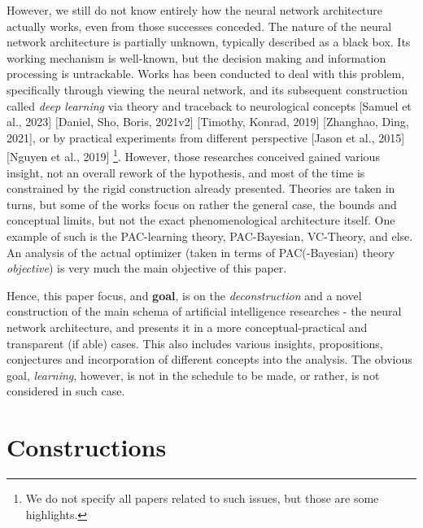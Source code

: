 However, we still do not know entirely how the neural network architecture actually works, even from those successes conceded. The nature of the neural network architecture is partially unknown, typically described as a black box. Its working mechanism is well-known, but the decision making and information processing is untrackable. Works has been conducted to deal with this problem, specifically through viewing the neural network, and its subsequent construction called \textit{deep learning} via theory and traceback to neurological concepts [Samuel et al., 2023] [Daniel, Sho, Boris, 2021v2] [Timothy, Konrad, 2019] [Zhanghao, Ding, 2021], or by practical experiments from different perspective [Jason et al., 2015] [Nguyen et al., 2019] \footnote{We do not specify all papers related to such issues, but those are some highlights.}. However, those researches conceived gained various insight, not an overall rework of the hypothesis, and most of the time is constrained by the rigid construction already presented. Theories are taken in turns, but some of the works focus on rather the general case, the bounds and conceptual limits, but not the exact phenomenological architecture itself. One example of such is the PAC-learning theory, PAC-Bayesian, VC-Theory, and else. An analysis of the actual optimizer (taken in terms of PAC(-Bayesian) theory \textit{objective}) is very much the main objective of this paper. 

Hence, this paper focus, and \textbf{goal}, is on the \textit{deconstruction} and a novel construction of the main schema of artificial intelligence researches - the neural network architecture, and presents it in a more conceptual-practical and transparent (if able) cases. This also includes various insights, propositions, conjectures and incorporation of different concepts into the analysis. The obvious goal, \textit{learning}, however, is not in the schedule to be made, or rather, is not considered in such case. 

\section{Constructions}

